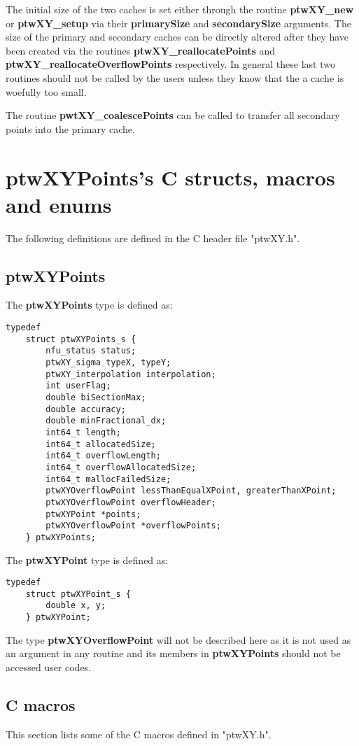 \documentclass[11pt]{article}
\newcommand{\highlight}[1]{{\bf #1}}
\begin{document}
The initial size of the two caches is set either through the routine \highlight{ptwXY\_new} or \highlight{ptwXY\_\-setup} via their
\highlight{primarySize} and \highlight{secondarySize} arguments. The size of the primary and secondary caches can be directly altered after
they have been created via the
routines \highlight{ptwXY\_reallo\-cate\-Points} and \highlight{ptwXY\_\-reallo\-cate\-Overflow\-Points} respectively. 
In general these last two routines should
not be called by the users unless they know that the a cache is woefully too small.

The routine \highlight{pwtXY\_coalescePoints} can be called to transfer all secondary points into the primary cache.

\section{ptwXYPoints's C structs, macros and enums}
The following definitions are defined in the C header file "ptwXY.h".

\subsection{ptwXYPoints}
The \highlight{ptwXYPoints} type is defined as:
\begin{verbatim}
typedef
    struct ptwXYPoints_s {
        nfu_status status;
        ptwXY_sigma typeX, typeY;
        ptwXY_interpolation interpolation;
        int userFlag;
        double biSectionMax;
        double accuracy;
        double minFractional_dx;
        int64_t length;
        int64_t allocatedSize;
        int64_t overflowLength;
        int64_t overflowAllocatedSize;
        int64_t mallocFailedSize;
        ptwXYOverflowPoint lessThanEqualXPoint, greaterThanXPoint;
        ptwXYOverflowPoint overflowHeader;
        ptwXYPoint *points;
        ptwXYOverflowPoint *overflowPoints;
    } ptwXYPoints;
\end{verbatim}

The \highlight{ptwXYPoint} type is defined as:
\begin{verbatim}
typedef
    struct ptwXYPoint_s {
        double x, y;
    } ptwXYPoint;
\end{verbatim}

The type \highlight{ptwXYOverflowPoint} will not be described here as it is not used as an argument in any routine and
its members in \highlight{ptwXYPoints} should not be accessed user codes.

\subsection{C macros}
This section lists some of the C macros defined in "ptwXY.h".
\end{document}
